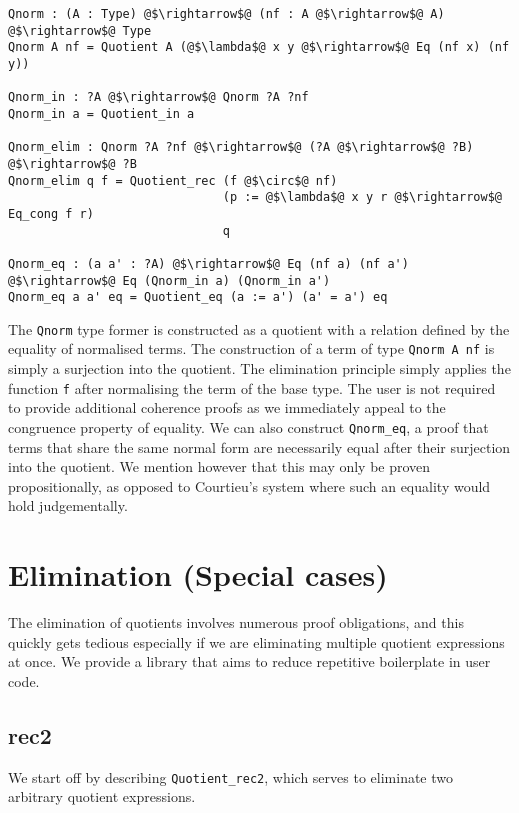 \documentclass[12pt,twoside,maitrise]{dms}
\theoremstyle{definition}
\numberwithin{equation}{section}
\numberwithin{table}{chapter}
\numberwithin{figure}{chapter}
\newcommand\id[1] {\texttt{#1}}
\begin{document}
\begin{verbatim}
Qnorm : (A : Type) @$\rightarrow$@ (nf : A @$\rightarrow$@ A) @$\rightarrow$@ Type
Qnorm A nf = Quotient A (@$\lambda$@ x y @$\rightarrow$@ Eq (nf x) (nf y))

Qnorm_in : ?A @$\rightarrow$@ Qnorm ?A ?nf
Qnorm_in a = Quotient_in a

Qnorm_elim : Qnorm ?A ?nf @$\rightarrow$@ (?A @$\rightarrow$@ ?B) @$\rightarrow$@ ?B
Qnorm_elim q f = Quotient_rec (f @$\circ$@ nf)
                              (p := @$\lambda$@ x y r @$\rightarrow$@ Eq_cong f r)
                              q

Qnorm_eq : (a a' : ?A) @$\rightarrow$@ Eq (nf a) (nf a') @$\rightarrow$@ Eq (Qnorm_in a) (Qnorm_in a')
Qnorm_eq a a' eq = Quotient_eq (a := a') (a' = a') eq
\end{verbatim}

The \id{Qnorm} type former is constructed as a quotient with a relation defined
by the equality of normalised terms. The construction of a term of type
\id{Qnorm A nf} is simply a surjection into the quotient. The elimination
principle simply applies the function \id{f} after normalising the term of the
base type. The user is not required to provide additional coherence proofs as we
immediately appeal to the congruence property of equality. We can also construct
\id{Qnorm\_eq}, a proof that terms that share the same normal form are
necessarily equal after their surjection into the quotient. We mention however
that this may only be proven propositionally, as opposed to Courtieu's system
where such an equality would hold judgementally.

\section{Elimination (Special cases)}

The elimination of quotients involves numerous proof obligations, and this
quickly gets tedious especially if we are eliminating multiple quotient
expressions at once. We provide a library that aims to reduce repetitive
boilerplate in user code.

\subsection*{rec2}\label{subsec:rec2}
We start off by describing \id{Quotient\_rec2}, which serves to eliminate two arbitrary quotient expressions.
\end{document}
